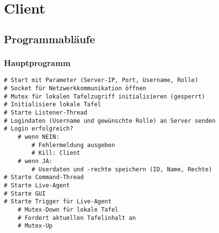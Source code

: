 \section{Client}

\subsection{Programmabläufe}

\subsubsection{Hauptprogramm}
\begin{lstlisting}
# Start mit Parameter (Server-IP, Port, Username, Rolle)
# Socket für Netzwerkkommunikation öffnen
# Mutex für lokalen Tafelzugriff initialisieren (gesperrt)
# Initialisiere lokale Tafel
# Starte Listener-Thread
# Logindaten (Username und gewünschte Rolle) an Server senden
# Login erfolgreich?
    # wenn NEIN: 
        # Fehlermeldung ausgeben
        # Kill: Client
    # wenn JA:
        # Userdaten und -rechte speichern (ID, Name, Rechte)
# Starte Command-Thread
# Starte Live-Agent
# Starte GUI
# Starte Trigger für Live-Agent
    # Mutex-Down für lokale Tafel
    # Fordert aktuellen Tafelinhalt an
    # Mutex-Up
\end{lstlisting}

